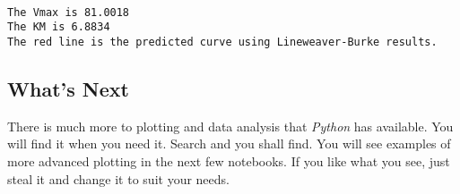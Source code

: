 \documentclass[11pt]{article}
\begin{document}
    \begin{center}
    \end{center}
    { \hspace*{\fill} \\}
    
    \begin{Verbatim}[commandchars=\\\{\}]
The Vmax is 81.0018
The KM is 6.8834
The red line is the predicted curve using Lineweaver-Burke results.
    \end{Verbatim}

    \subsection{What's Next}\label{whats-next}

There is much more to plotting and data analysis that \emph{Python} has
available. You will find it when you need it. Search and you shall find.
You will see examples of more advanced plotting in the next few
notebooks. If you like what you see, just steal it and change it to suit
your needs.


    
    
    
\end{document}
